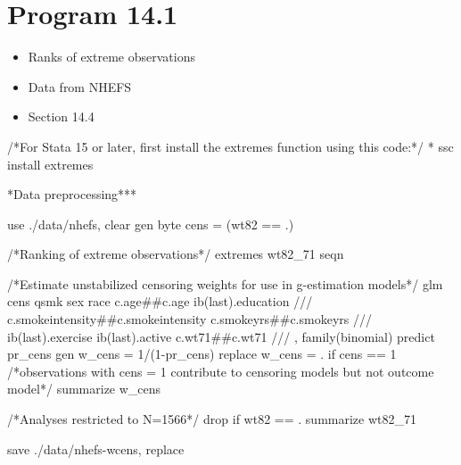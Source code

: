 \documentclass[
  10pt,
  a4paper,
]{book}
\newenvironment{Shaded}{\begin{snugshade}}{\end{snugshade}}
\newcommand{\CommentTok}[1]{\textcolor[rgb]{0.37,0.37,0.37}{#1}}
\newcommand{\FunctionTok}[1]{\textcolor[rgb]{0.28,0.35,0.67}{#1}}
\newcommand{\KeywordTok}[1]{\textcolor[rgb]{0.00,0.46,0.62}{#1}}
\newcommand{\NormalTok}[1]{\textcolor[rgb]{0.00,0.46,0.62}{#1}}
\providecommand{\tightlist}{%
  \setlength{\itemsep}{0pt}\setlength{\parskip}{0pt}}
\begin{document}
\hypertarget{program-14.1-1}{%
\section{Program 14.1}\label{program-14.1-1}}

\begin{itemize}
\tightlist
\item
  Ranks of extreme observations
\item
  Data from NHEFS
\item
  Section 14.4
\end{itemize}

\begin{Shaded}
\begin{Highlighting}[]
\CommentTok{/*For Stata 15 or later, first install the extremes function using this code:*/}
\NormalTok{* }\KeywordTok{ssc}\NormalTok{ install extremes }

\NormalTok{*Data preprocessing***}

\KeywordTok{use}\NormalTok{ ./}\KeywordTok{data}\NormalTok{/nhefs, }\KeywordTok{clear}
\KeywordTok{gen} \KeywordTok{byte}\NormalTok{ cens = (wt82 == .)}

\CommentTok{/*Ranking of extreme observations*/}
\NormalTok{extremes wt82\_71 seqn}

\CommentTok{/*Estimate unstabilized censoring weights for use in g{-}estimation models*/}
\KeywordTok{glm}\NormalTok{ cens qsmk sex race c.age\#\#c.age ib(}\FunctionTok{last}\NormalTok{).education }\CommentTok{///}
\NormalTok{  c.smokeintensity\#\#c.smokeintensity c.smokeyrs\#\#c.smokeyrs }\CommentTok{///}
\NormalTok{  ib(}\FunctionTok{last}\NormalTok{).exercise ib(}\FunctionTok{last}\NormalTok{).active c.wt71\#\#c.wt71 }\CommentTok{///}
\NormalTok{  , }\KeywordTok{family}\NormalTok{(binomial)}
\KeywordTok{predict}\NormalTok{ pr\_cens}
\KeywordTok{gen}\NormalTok{ w\_cens = 1/(1{-}pr\_cens)}
\KeywordTok{replace}\NormalTok{ w\_cens = . }\KeywordTok{if}\NormalTok{ cens == 1 }
\CommentTok{/*observations with cens = 1 contribute to censoring models but not outcome model*/}
\KeywordTok{summarize}\NormalTok{ w\_cens}

\CommentTok{/*Analyses restricted to N=1566*/}
\KeywordTok{drop} \KeywordTok{if}\NormalTok{ wt82 == .}
\KeywordTok{summarize}\NormalTok{ wt82\_71}

\KeywordTok{save}\NormalTok{ ./}\KeywordTok{data}\NormalTok{/nhefs{-}wcens, }\KeywordTok{replace}
\end{Highlighting}
\end{Shaded}
\end{document}
